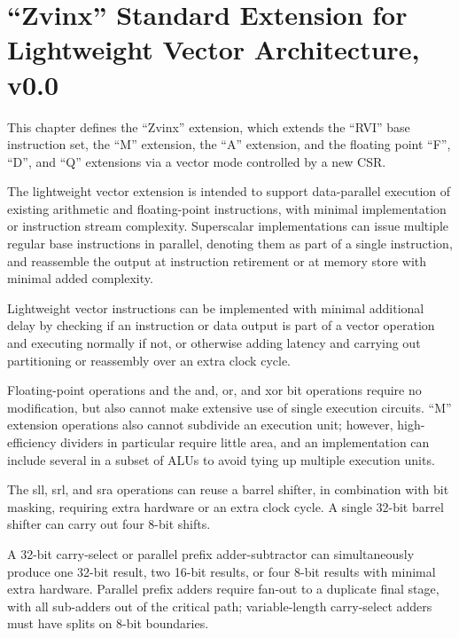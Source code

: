 \chapter{``Zvinx'' Standard Extension for Lightweight Vector Architecture, v0.0}
\label{sec:zvinx}

This chapter defines the ``Zvinx'' extension, which extends the ``RVI'' base
instruction set, the ``M'' extension, the ``A'' extension, and the floating
point ``F'', ``D'', and ``Q'' extensions via a vector mode controlled by a
new CSR.

\begin{commentary}
    The lightweight vector extension is intended to support data-parallel
    execution of existing arithmetic and floating-point instructions, with
    minimal implementation or instruction stream complexity.  Superscalar
    implementations can issue multiple regular base instructions in parallel,
    denoting them as part of a single instruction, and reassemble the output
    at instruction retirement or at memory store with minimal added
    complexity.

    Lightweight vector instructions can be implemented with minimal additional
    delay by checking if an instruction or data output is part of a vector
    operation and executing normally if not, or otherwise adding latency and
    carrying out partitioning or reassembly over an extra clock cycle.

    Floating-point operations and the and, or, and xor bit operations require
    no modification, but also cannot make extensive use of single execution
    circuits.  ``M'' extension operations also cannot subdivide an execution
    unit; however, high-efficiency dividers in particular require little area,
    and an implementation can include several in a subset of ALUs to avoid
    tying up multiple execution units.

    The sll, srl, and sra operations can reuse a barrel shifter, in combination
    with bit masking, requiring extra hardware or an extra clock cycle.  A
    single 32-bit barrel shifter can carry out four 8-bit shifts.

    A 32-bit carry-select or parallel prefix adder-subtractor can simultaneously
    produce one 32-bit result, two 16-bit results, or four 8-bit results with
    minimal extra hardware.  Parallel prefix adders require fan-out to a duplicate
    final stage, with all sub-adders out of the critical path; variable-length
    carry-select adders must have splits on 8-bit boundaries.


\end{commentary}
